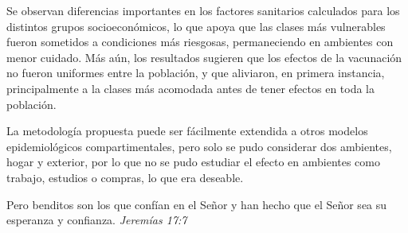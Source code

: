 \documentclass[upright, contnum]{umemoria}
\begin{document}
Se observan diferencias importantes en los factores sanitarios calculados para los distintos grupos socioeconómicos, lo que apoya que las clases más vulnerables fueron sometidos a condiciones más riesgosas, permaneciendo en ambientes con menor cuidado. Más aún, los resultados sugieren que los efectos de la vacunación no fueron uniformes entre la población, y que aliviaron, en primera instancia, principalmente a la clases más acomodada antes de tener efectos en toda la población.

La metodología propuesta puede ser fácilmente extendida a otros modelos epidemiológicos compartimentales, pero solo se pudo considerar dos ambientes, hogar y exterior, por lo que no se pudo estudiar el efecto en ambientes como trabajo, estudios o compras, lo que era deseable. %







\begin{dedicatoria}
Pero benditos son los que confían en el Señor\break
y han hecho que el Señor sea su esperanza y confianza.\break
\emph{Jeremías 17:7}
\end{dedicatoria}
 

\end{document}
